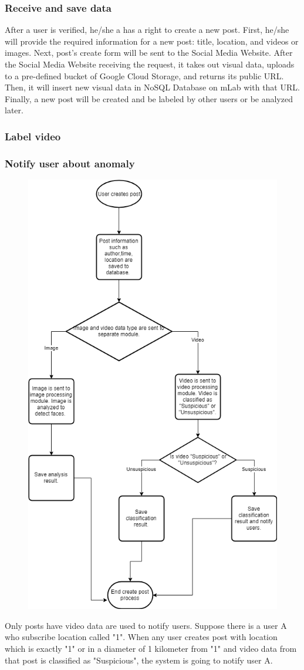 \subsubsection{Receive and save data}
After a user is verified, he/she a has a right to create a new post. First, he/she will provide the required information for a new post: title, location, and videos or images. Next, post's create form will be sent to the Social Media Website.  After the Social Media Website receiving the request, it takes out visual data, uploads to a pre-defined bucket of Google Cloud Storage, and returns its public URL. Then, it will insert new visual data in NoSQL Database on mLab with that URL. Finally, a new post will be created and be labeled by other users or be analyzed later.
\subsubsection{Label video}
\cleardoublepage
\subsubsection{Notify user about anomaly}
\begin{center}
    \begin{figure}[H]
    \centering
    \includegraphics[width=0.7\columnwidth]{images/chap4/createpostflowchart.png}
    \end{figure}
\end{center}
Only posts have video data are used to notify users. Suppose there is a user A who subscribe location called "1". When any user creates post with location which is exactly "1" or in a diameter of 1 kilometer from "1" and video data from that post is classified as "Suspicious", the system is going to notify user A.
